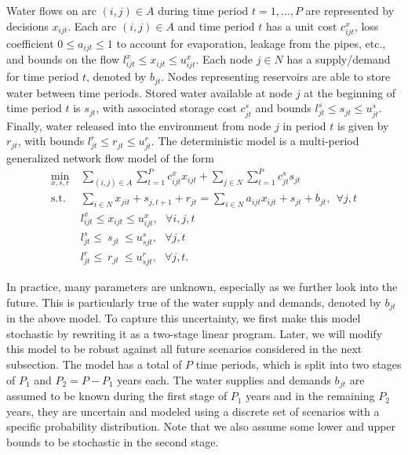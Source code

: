 \documentclass[12pt]{amsart}
\newcommand{\st}{\mbox{s.t.}}
\begin{document}
Water flows on arc $(i,j) \in A$ during time period $t = 1, \dots, P$ are represented by decisions $x_{ijt}$.
Each arc $(i,j) \in A$ and time period $t$ has a unit cost $c_{ijt}^x$, loss coefficient $0 \leq a_{ijt} \leq 1$ to account for evaporation, leakage from the pipes, etc., and bounds on the flow $l_{ijt}^x \leq x_{ijt} \leq u_{ijt}^x$.
Each node $j \in N$ has a supply/demand for time period $t$, denoted by $b_{jt}$.
Nodes representing reservoirs are able to store water between time periods.
Stored water available at node $j$ at the beginning of time period $t$ is $s_{jt}$, with associated storage cost $c_{jt}^s$ and bounds $l_{jt}^s \leq s_{jt} \leq u_{jt}^s$.
Finally, water released into the environment from node $j$ in period $t$ is given by $r_{jt}$, with bounds $l_{jt}^r \leq r_{jt} \leq u_{jt}^r$.
The deterministic model is a multi-period generalized network flow model of the form
\begin{align*}
	\min_{x,s,r} \ & \sum_{(i,j) \in A} \sum_{t=1}^P c_{ijt}^x x_{ijt} + \sum_{j \in N} \sum_{t=1}^P c_{jt}^s s_{jt}\\
	\st \ & \sum_{i \in N} x_{jit} + s_{j,t+1} + r_{jt} = \sum_{i \in N} a_{ijt} x_{ijt} + s_{jt} + b_{jt}, \ \ \forall j,t \\
	& l_{ijt}^x \leq x_{ijt} \leq u_{ijt}^x,\ \ \ \forall i,j,t \\
	& l_{jt}^s \leq\ s_{jt}\  \leq u_{sjt}^s, \ \ \ \forall j,t \\
	& l_{jt}^r \leq\ r_{jt}\  \leq u_{sjt}^r, \ \ \ \forall j,t.
\end{align*}


In practice, many parameters are unknown, especially as we further look into the future. 
This is particularly true of the water supply and demands, denoted by $b_{jt}$ in the above model. 
To capture this uncertainty, we first make this model stochastic by rewriting it as a two-stage linear program.
Later, we will modify this model to be robust against all future scenarios considered in the next subsection. 
The model has a total of $P$ time periods, which is split into two stages of $P_1$ and $P_2 = P - P_1$ years each. 
The water supplies and demands $b_{jt}$ are assumed to be known during the first stage of $P_1$ years and in the remaining $P_2$ years, they are uncertain and modeled using a discrete set of scenarios with a specific probability distribution.  
Note that we also assume some lower and upper bounds to be stochastic in the second stage. 
\end{document}

